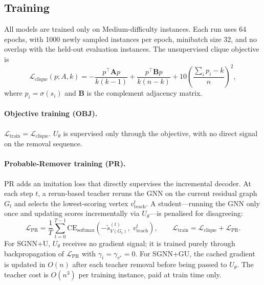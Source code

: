 \documentclass[11pt]{article}
\theoremstyle{plain}
\theoremstyle{remark}
\begin{document}
\subsection{Training}
\label{sec:training}

All models are trained only on Medium-difficulty instances. Each run uses 64
epochs, with 1000 newly sampled instances per epoch, minibatch size 32, and no
overlap with the held-out evaluation instances. The unsupervised clique objective is
\[
  \mathcal{L}_{\mathrm{clique}}(p; A, k)
  =
  -\frac{p^\top \mathbf{A} p}{k(k-1)}
  +
  \frac{p^\top \mathbf{B} p}{k(n-k)}
  +
  10\!\left(\frac{\textstyle\sum_i p_i - k}{n}\right)^{\!2},
\]
where $p_i = \sigma(s_i)$ and $\mathbf{B}$ is the complement adjacency matrix.

\paragraph{Objective training (OBJ).}
$\mathcal{L}_{\mathrm{train}} = \mathcal{L}_{\mathrm{clique}}$. $U_\theta$ is
supervised only through the objective, with no direct signal on the removal sequence.

\paragraph{Probable-Remover training (PR).}
PR adds an imitation loss that directly supervises the incremental decoder. At each
step $t$, a rerun-based teacher reruns the GNN on the current residual graph $G_t$
and selects the lowest-scoring vertex $v^t_{\mathrm{teach}}$. A student---running
the GNN only once and updating scores incrementally via $U_\theta$---is penalised
for disagreeing:
\[
  \mathcal{L}_{\mathrm{PR}} = \frac{1}{T} \sum_{t=0}^{T-1}
  \mathrm{CE}_{\mathrm{softmax}}\!\left(-\tilde{s}^{(t)}_{V(G_t)},\;
  v^t_{\mathrm{teach}}\right),
  \qquad
  \mathcal{L}_{\mathrm{train}} = \mathcal{L}_{\mathrm{clique}} +
  \mathcal{L}_{\mathrm{PR}}.
\]
For SGNN+U, $U_\theta$ receives no gradient signal; it is trained purely through
backpropagation of $\mathcal{L}_{\mathrm{PR}}$ with $\gamma_i = \gamma_{v^*} = 0$.
For SGNN+GU, the cached gradient is updated in $O(n)$ after each teacher removal
before being passed to $U_\theta$. The teacher cost is $O(n^3)$ per training
instance, paid at train time only.
\end{document}
